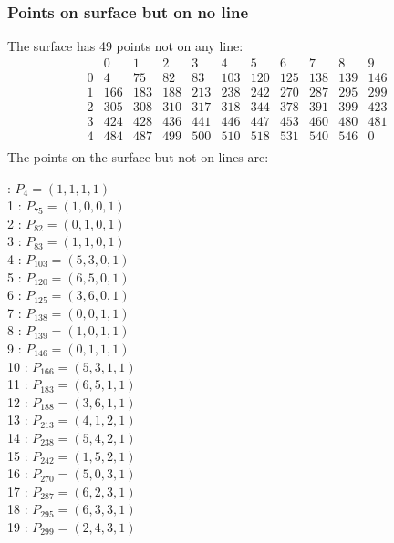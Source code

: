 \documentclass{article}
\begin{document}
{\subsubsection*{Points on surface but on no line}
The surface has 49 points not on any line:\\
$$
\begin{array}{r|*{10}{r}}
 & 0 & 1 & 2 & 3 & 4 & 5 & 6 & 7 & 8 & 9\\
\hline
0 & 4 & 75 & 82 & 83 & 103 & 120 & 125 & 138 & 139 & 146\\
1 & 166 & 183 & 188 & 213 & 238 & 242 & 270 & 287 & 295 & 299\\
2 & 305 & 308 & 310 & 317 & 318 & 344 & 378 & 391 & 399 & 423\\
3 & 424 & 428 & 436 & 441 & 446 & 447 & 453 & 460 & 480 & 481\\
4 & 484 & 487 & 499 & 500 & 510 & 518 & 531 & 540 & 546 & 0\\
\end{array}
$$
The points on the surface but not on lines are:\\
\begin{multicols}{2}
 : $P_{4}=( 1, 1, 1, 1 )$\\
1 : $P_{75}=( 1, 0, 0, 1 )$\\
2 : $P_{82}=( 0, 1, 0, 1 )$\\
3 : $P_{83}=( 1, 1, 0, 1 )$\\
4 : $P_{103}=( 5, 3, 0, 1 )$\\
5 : $P_{120}=( 6, 5, 0, 1 )$\\
6 : $P_{125}=( 3, 6, 0, 1 )$\\
7 : $P_{138}=( 0, 0, 1, 1 )$\\
8 : $P_{139}=( 1, 0, 1, 1 )$\\
9 : $P_{146}=( 0, 1, 1, 1 )$\\
10 : $P_{166}=( 5, 3, 1, 1 )$\\
11 : $P_{183}=( 6, 5, 1, 1 )$\\
12 : $P_{188}=( 3, 6, 1, 1 )$\\
13 : $P_{213}=( 4, 1, 2, 1 )$\\
14 : $P_{238}=( 5, 4, 2, 1 )$\\
15 : $P_{242}=( 1, 5, 2, 1 )$\\
16 : $P_{270}=( 5, 0, 3, 1 )$\\
17 : $P_{287}=( 6, 2, 3, 1 )$\\
18 : $P_{295}=( 6, 3, 3, 1 )$\\
19 : $P_{299}=( 2, 4, 3, 1 )$\\

\end{multicols}}
\end{document}
